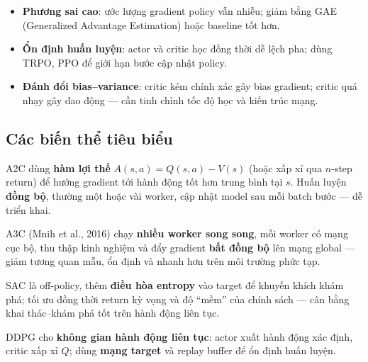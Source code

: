 \begin{luuy}[title={Thách thức cần xử lý}]
\begin{itemize}
  \item \textbf{Phương sai cao}: ước lượng gradient policy vẫn nhiễu; giảm bằng GAE (Generalized Advantage Estimation) hoặc baseline tốt hơn.
  \item \textbf{Ổn định huấn luyện}: actor và critic học đồng thời dễ lệch pha; dùng TRPO, PPO để giới hạn bước cập nhật policy.
  \item \textbf{Đánh đổi bias--variance}: critic kém chính xác gây bias gradient; critic quá nhạy gây dao động --- cần tinh chỉnh tốc độ học và kiến trúc mạng.
\end{itemize}
\end{luuy}

\subsection{Các biến thể tiêu biểu}

\begin{ynghia}[title={A2C --- Advantage Actor-Critic}]
A2C dùng \textbf{hàm lợi thế} $A(s,a) = Q(s,a) - V(s)$ (hoặc xấp xỉ qua $n$-step return) để hướng gradient tới hành động tốt hơn trung bình tại $s$. Huấn luyện \textbf{đồng bộ}, thường một hoặc vài worker, cập nhật model sau mỗi batch bước --- dễ triển khai.
\end{ynghia}

\begin{ynghia}[title={A3C --- Asynchronous Advantage Actor-Critic}]
A3C (Mnih et al., 2016) chạy \textbf{nhiều worker song song}, mỗi worker có mạng cục bộ, thu thập kinh nghiệm và đẩy gradient \textbf{bất đồng bộ} lên mạng global --- giảm tương quan mẫu, ổn định và nhanh hơn trên môi trường phức tạp.
\end{ynghia}

\begin{ynghia}[title={SAC --- Soft Actor-Critic}]
SAC là off-policy, thêm \textbf{điều hòa entropy} vào target để khuyến khích khám phá; tối ưu đồng thời return kỳ vọng và độ ``mềm'' của chính sách --- cân bằng khai thác--khám phá tốt trên hành động liên tục.
\end{ynghia}

\begin{ynghia}[title={DDPG --- Deep Deterministic Policy Gradient}]
DDPG cho \textbf{không gian hành động liên tục}: actor xuất hành động xác định, critic xấp xỉ $Q$; dùng \textbf{mạng target} và replay buffer để ổn định huấn luyện.
\end{ynghia}

